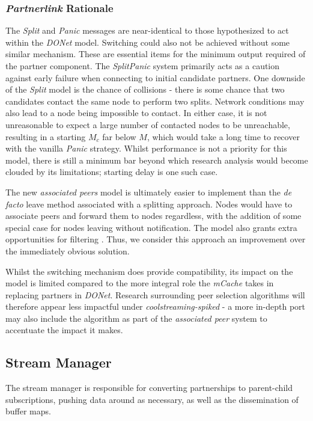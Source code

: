 \documentclass[12pt,a4paper]{article}
\begin{document}
\subsubsection{\textit{Partnerlink} Rationale} \label{css:partnerlink:rationale}
The \textit{Split} and \textit{Panic} messages are near-identical to those hypothesized to act within the \textit{DONet} model. Switching could also not be achieved without some similar mechanism. These are essential items  for the minimum output required of the partner component. The \textit{SplitPanic} system primarily acts as a caution against early failure when connecting to initial candidate partners. One downside of the \textit{Split} model is the chance of collisions - there is some chance that two candidates contact the same node to perform two splits. Network conditions may also lead to a node being impossible to contact. In either case, it is not unreasonable to expect a large number of contacted nodes to be unreachable, resulting in a starting \(M_c\) far below \(M\), which would take a long time to recover with the vanilla \textit{Panic} strategy. Whilst performance is not a priority for this model, there is still a minimum bar beyond which research analysis would become clouded by its limitations; starting delay is one such case.

The new \textit{associated peers} model is ultimately easier to implement than the \textit{de facto} leave method associated with a splitting approach. Nodes would have to associate peers and forward them to nodes regardless, with the addition of some special case for nodes leaving without notification. The model also grants extra opportunities for filtering . Thus, we consider this approach an improvement over the immediately obvious solution.

Whilst the switching mechanism does provide compatibility, its impact on the model is limited compared to the more integral role the \textit{mCache} takes in replacing partners in \textit{DONet}. Research surrounding peer selection algorithms will therefore appear less impactful under \textit{coolstreaming-spiked} - a more in-depth port may also include the algorithm as part of the \textit{associated peer} system to accentuate the impact it makes.

\subsection{Stream Manager} \label{css:stream}
The stream manager is responsible for converting partnerships to parent-child subscriptions, pushing data around as necessary, as well as the dissemination of buffer maps.
\end{document}
